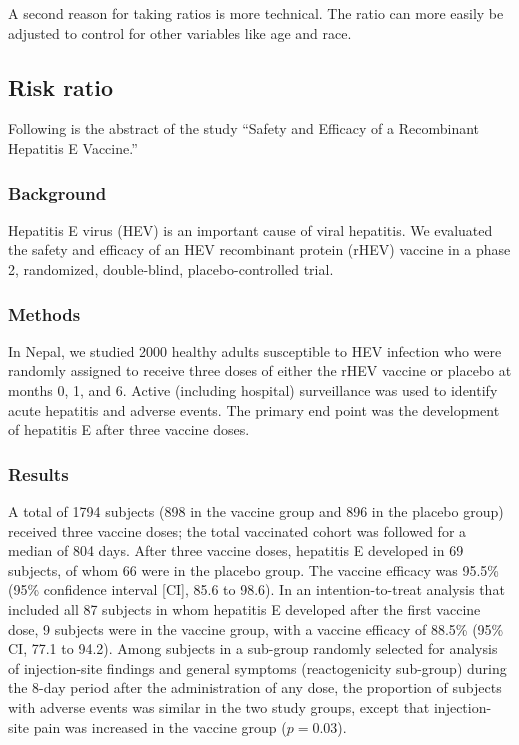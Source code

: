 \documentclass[11pt, chapterprefix=true]{scrbook}\usepackage[]{graphicx}\usepackage[]{color}
\begin{document}
A second reason for taking ratios is more technical.  The ratio can more easily be adjusted to control for other variables like age and race.

 \subsection{Risk ratio}

Following is the abstract of the study ``Safety and Efficacy of a Recombinant Hepatitis E Vaccine.''  %

\subsubsection{Background}

Hepatitis E virus (HEV) is an important cause of viral hepatitis.  We evaluated
the safety and efficacy of an HEV recombinant protein (rHEV) vaccine in a phase
2, randomized, double-blind, placebo-controlled trial.

\subsubsection{Methods}

In Nepal, we studied 2000 healthy adults susceptible to HEV infection who were randomly assigned to receive three doses of either the rHEV vaccine or placebo at months 0, 1, and 6. Active (including hospital) surveillance was used to identify acute hepatitis and adverse events. The primary end point was the development of hepatitis E after three vaccine doses.

\subsubsection{Results}

A total of 1794 subjects (898 in the vaccine group and 896 in the placebo group) received three vaccine doses; the total vaccinated cohort was followed for a median of 804 days.  After three vaccine doses, hepatitis E developed in 69 subjects, of whom 66 were in the placebo group.  The vaccine efficacy was 95.5\% (95\% confidence interval [CI], 85.6 to 98.6).  In an intention-to-treat analysis that included all 87 subjects in whom hepatitis E developed after the first vaccine dose, 9 subjects were in the vaccine group, with a vaccine efficacy of 88.5\% (95\% CI, 77.1 to 94.2).  Among subjects in a sub-group randomly selected for analysis of injection-site findings and general symptoms (reactogenicity sub-group) during the 8-day period after the administration of any dose, the proportion of subjects with adverse events was similar in the two study groups, except that injection-site pain was increased in the vaccine group ($p = 0.03$).
\end{document}
